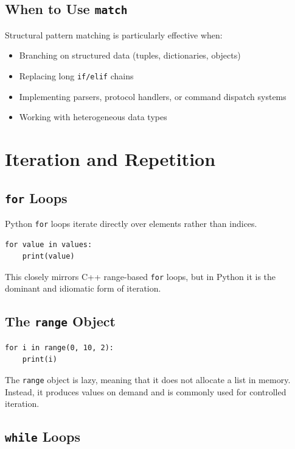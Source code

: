 \subsection{When to Use \texttt{match}}

Structural pattern matching is particularly effective when:
\begin{itemize}
  \item Branching on structured data (tuples, dictionaries, objects)
  \item Replacing long \texttt{if/elif} chains
  \item Implementing parsers, protocol handlers, or command dispatch systems
  \item Working with heterogeneous data types
\end{itemize}

\section{Iteration and Repetition}

\subsection{\texttt{for} Loops}

Python \texttt{for} loops iterate directly over elements rather than indices.

\begin{verbatim}
for value in values:
    print(value)
\end{verbatim}

This closely mirrors C++ range-based \texttt{for} loops, but in Python it is the dominant and idiomatic form of iteration.

\subsection{The \texttt{range} Object}

\begin{verbatim}
for i in range(0, 10, 2):
    print(i)
\end{verbatim}

The \texttt{range} object is lazy, meaning that it does not allocate a list in memory. Instead, it produces values on demand and is commonly used for controlled iteration.

\subsection{\texttt{while} Loops}

